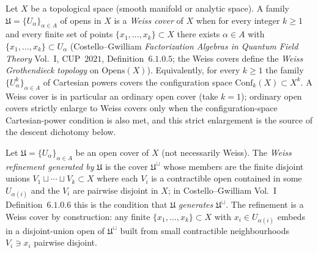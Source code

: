 \begin{definition}
\label{def:weiss-cover}
Let $X$ be a topological space \textup{(}smooth manifold or analytic space\textup{).} A family $\mathfrak U = \{U_\alpha\}_{\alpha \in A}$ of opens in $X$ is a \emph{Weiss cover} of $X$ when for every integer $k \geq 1$ and every finite set of points $\{x_1, \ldots, x_k\} \subset X$ there exists $\alpha \in A$ with $\{x_1, \ldots, x_k\} \subset U_\alpha$ \textup{(}Costello--Gwilliam \emph{Factorization Algebras in Quantum Field Theory} Vol.~I, CUP~$2021$, Definition~$6.1.0.5$; the Weiss covers define the \emph{Weiss Grothendieck topology} on $\mathrm{Opens}(X)$\textup{).} Equivalently, for every $k \geq 1$ the family $\{U_\alpha^k\}_{\alpha \in A}$ of Cartesian powers covers the configuration space $\mathrm{Conf}_k(X) \subset X^k$. A Weiss cover is in particular an ordinary open cover \textup{(}take $k = 1$\textup{)}; ordinary open covers strictly enlarge to Weiss covers only when the configuration-space Cartesian-power condition is also met, and this strict enlargement is the source of the descent dichotomy below.
\end{definition}

\begin{definition}
\label{def:weiss-refinement}
Let $\mathfrak U = \{U_\alpha\}_{\alpha \in A}$ be an open cover of $X$ \textup{(}not necessarily Weiss\textup{).} The \emph{Weiss refinement generated by} $\mathfrak U$ is the cover $\mathfrak U^\sqcup$ whose members are the finite disjoint unions $V_1 \sqcup \cdots \sqcup V_k \subset X$ where each $V_i$ is a contractible open contained in some $U_{\alpha(i)}$ and the $V_i$ are pairwise disjoint in $X$; in Costello--Gwilliam Vol.~I Definition~$6.1.0.6$ this is the condition that $\mathfrak U$ \emph{generates} $\mathfrak U^\sqcup$. The refinement is a Weiss cover by construction: any finite $\{x_1, \ldots, x_k\} \subset X$ with $x_i \in U_{\alpha(i)}$ embeds in a disjoint-union open of $\mathfrak U^\sqcup$ built from small contractible neighbourhoods $V_i \ni x_i$ pairwise disjoint.
\end{definition}

